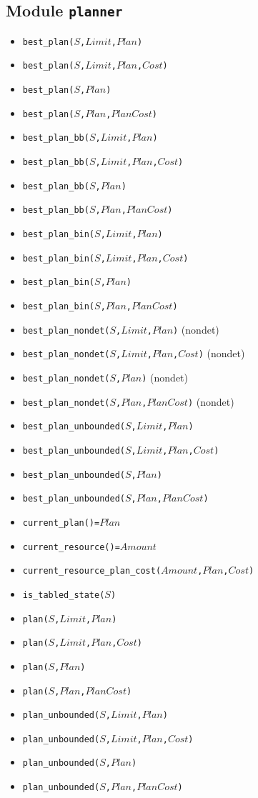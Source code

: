 \documentclass[10pt]{article}
\begin{document}
\begin{multicols}{2}
\section*{Module \texttt{planner}}
\begin{scriptsize}
\begin{itemize}
\item \texttt{best\_plan($S$,$Limit$,$Plan$)}
\item \texttt{best\_plan($S$,$Limit$,$Plan$,$Cost$)}
\item \texttt{best\_plan($S$,$Plan$)}
\item \texttt{best\_plan($S$,$Plan$,$PlanCost$)}
\item \texttt{best\_plan\_bb($S$,$Limit$,$Plan$)}
\item \texttt{best\_plan\_bb($S$,$Limit$,$Plan$,$Cost$)}
\item \texttt{best\_plan\_bb($S$,$Plan$)}
\item \texttt{best\_plan\_bb($S$,$Plan$,$PlanCost$)}
\item \texttt{best\_plan\_bin($S$,$Limit$,$Plan$)}
\item \texttt{best\_plan\_bin($S$,$Limit$,$Plan$,$Cost$)}
\item \texttt{best\_plan\_bin($S$,$Plan$)}
\item \texttt{best\_plan\_bin($S$,$Plan$,$PlanCost$)}
\item \texttt{best\_plan\_nondet($S$,$Limit$,$Plan$)} (nondet)
\item \texttt{best\_plan\_nondet($S$,$Limit$,$Plan$,$Cost$)} (nondet)
\item \texttt{best\_plan\_nondet($S$,$Plan$)} (nondet)
\item \texttt{best\_plan\_nondet($S$,$Plan$,$PlanCost$)} (nondet)
\item \texttt{best\_plan\_unbounded($S$,$Limit$,$Plan$)}
\item \texttt{best\_plan\_unbounded($S$,$Limit$,$Plan$,$Cost$)}
\item \texttt{best\_plan\_unbounded($S$,$Plan$)}
\item \texttt{best\_plan\_unbounded($S$,$Plan$,$PlanCost$)}
\item \texttt{current\_plan()=$Plan$}
\item \texttt{current\_resource()=$Amount$}
\item \texttt{current\_resource\_plan\_cost($Amount$,$Plan$,$Cost$)}
\item \texttt{is\_tabled\_state($S$)}
\item \texttt{plan($S$,$Limit$,$Plan$)}
\item \texttt{plan($S$,$Limit$,$Plan$,$Cost$)}
\item \texttt{plan($S$,$Plan$)}
\item \texttt{plan($S$,$Plan$,$PlanCost$)}
\item \texttt{plan\_unbounded($S$,$Limit$,$Plan$)}
\item \texttt{plan\_unbounded($S$,$Limit$,$Plan$,$Cost$)}
\item \texttt{plan\_unbounded($S$,$Plan$)}
\item \texttt{plan\_unbounded($S$,$Plan$,$PlanCost$)}
\end{itemize}
\end{scriptsize}

\end{multicols}
\end{document}
